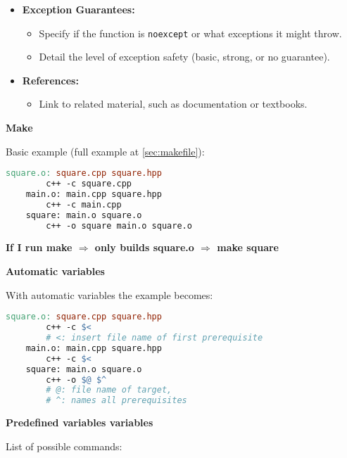 \documentclass[fontsize=8pt, a4paper, landscape, fleqn]{scrartcl}
\renewcommand{\section}[1]{%
    \noindent\colorbox{sectioncolor}{%
        \parbox{\dimexpr\columnwidth-2\fboxsep}{\color{white}\textbf{#1}}}%
    \vspace{0.5mm}%
}
\renewcommand{\subsection}[1]{%
    \noindent\colorbox{subsectioncolor}{%
        \parbox{\dimexpr\columnwidth-2\fboxsep}{\color{white}\textbf{#1}}}%
    \vspace{0.5mm}%
}
\begin{document}
\begin{multicols*}{3}[\raggedcolumns]
\begin{itemize}
    \item \textbf{Exception Guarantees:}
    \begin{itemize}
        \item Specify if the function is \texttt{noexcept} or what exceptions it might throw.
        \item Detail the level of exception safety (basic, strong, or no guarantee).
    \end{itemize}

    \item \textbf{References:}
    \begin{itemize}
        \item Link to related material, such as documentation or textbooks.
    \end{itemize}
\end{itemize}
    \section{Make}
    
    Basic example (full example at \colorbox{blue!7}{\autoref{sec:makefile}}):
    \begin{lstlisting}[language=make, breaklines]
    square.o: square.cpp square.hpp
        c++ -c square.cpp
    main.o: main.cpp square.hpp
        c++ -c main.cpp
    square: main.o square.o
        c++ -o square main.o square.o \end{lstlisting}
    \textbf{If I run make $\Rightarrow$ only builds square.o $\Rightarrow$ make square}
    \subsection{Automatic variables}
    With automatic variables the example becomes:
    \begin{lstlisting}[language=make, breaklines]
    square.o: square.cpp square.hpp
        c++ -c $<
        # <: insert file name of first prerequisite
    main.o: main.cpp square.hpp
        c++ -c $<
    square: main.o square.o
        c++ -o $@ $^
        # @: file name of target, 
        # ^: names all prerequisites \end{lstlisting}

    \subsection{Predefined variables variables}
    List of possible commands:


\end{multicols*}
\end{document}
